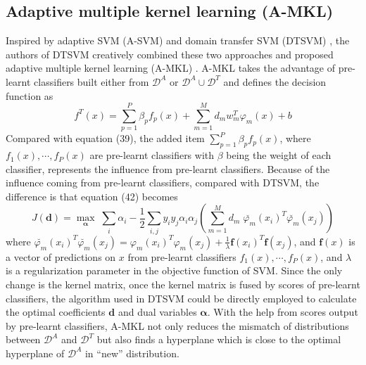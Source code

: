 \subsection{Adaptive multiple kernel learning (A-MKL)}
Inspired by adaptive SVM (A-SVM) \cite{yang2007cross} and domain transfer SVM (DTSVM) \cite{duan2009domain}, the authors of DTSVM creatively combined these two approaches and proposed adaptive multiple kernel learning (A-MKL) \cite{duan2012visual}.  A-MKL takes the advantage of pre-learnt classifiers built either from $\mathcal{D}^A$ or $\mathcal{D}^A \cup \mathcal{D}^T$ and defines the decision function as
\begin{equation}
f^T(x) = \sum_{p=1}^{P} \beta_p f_p(x) + \sum_{m=1}^{M} d_m w_m^T \varphi_m(x) + b 
\end{equation}
Compared with equation (39), the added item $\sum_{p=1}^{P} \beta_p f_p(x)$, where $f_1(x), \cdots, f_P(x)$ are pre-learnt classifiers with $\beta$ being the weight of each classifier, represents the influence from pre-learnt classifiers. Because of the influence coming from pre-learnt classifiers, compared with DTSVM, the difference is that equation (42) becomes
\begin{equation}
J(\mathbf{d}) = \underset{\boldsymbol{\alpha}}{\max} \; \sum_i \alpha_i - \frac{1}{2} \sum_{i,j} y_i y_j \alpha_i \alpha_j  (\sum_{m=1}^M d_m \; \breve{\varphi_m} (x_i) ^T \breve{\varphi_m} (x_j))           
\end{equation}
where $\breve{\varphi_m} (x_i) ^T \breve{\varphi_m} (x_j) = \varphi_m (x_i) ^T \varphi_m (x_j) + \frac{1}{\lambda} \boldsymbol{f} (x_i)^T \boldsymbol{f}  (x_j)$, and $\boldsymbol{f}(x)$ is a vector of predictions on $x$ from pre-learnt classifiers $f_1(x), \cdots, f_P(x)$, and $\lambda$ is a regularization parameter in the objective function of SVM. Since the only change is the kernel matrix, once the kernel matrix is fused by scores of pre-learnt classifiers, the algorithm used in DTSVM could be directly employed to calculate the optimal coefficients $\mathbf{d}$ and dual variables $\boldsymbol{\alpha}$. With the help from scores output by pre-learnt classifiers, A-MKL not only reduces the mismatch of distributions between $\mathcal{D}^A$ and $\mathcal{D}^T$ but also finds a hyperplane which is close to the optimal hyperplane of $\mathcal{D}^A$ in ``new'' distribution. 
